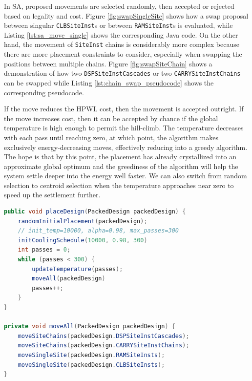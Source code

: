 In SA, proposed movements are selected randomly, then accepted or rejected based on legality and cost. 
Figure \ref{fig:swapSingleSite} shows how a swap proposal between singular \texttt{CLBSiteInst}s or between \texttt{RAMSiteInst}s is evaluated, while Listing \ref{lst:sa_move_single} shows the corresponding Java code.
On the other hand, the movement of \texttt{SiteInst} chains is considerably more complex because there are more placement constraints to consider, especially when swapping the positions between multiple chains.
Figure \ref{fig:swapSiteChain} shows a demonstration of how two \texttt{DSPSiteInstCascades} or two \texttt{CARRYSiteInstChains} can be swapped while Listing \ref{lst:chain_swap_pseudocode} shows the corresponding pseudocode. 

If the move reduces the HPWL cost, then the movement is accepted outright.
If the move increases cost, then it can be accepted by chance if the global temperature is high enough to permit the hill-climb.
The temperature decreases with each pass until reaching zero, at which point, the algorithm makes exclusively energy-decreasing moves, effectively reducing into a greedy algorithm. 
The hope is that by this point, the placement has already crystallized into an approximate global optimum and the greediness of the algorithm will help the system settle deeper into the energy well faster. 
We can also switch from random selection to centroid selection when the temperature approaches near zero to speed up the settlement further. 


\begin{lstlisting}[language=java, caption={SA pseudocode: outer loop}, label={lst:sa_outer}]
public void placeDesign(PackedDesign packedDesign) {
    randomInitialPlacement(packedDesign);
    // init_temp=10000, alpha=0.98, max_passes=300
    initCoolingSchedule(10000, 0.98, 300)
    int passes = 0;
    while (passes < 300) {
        updateTemperature(passes);
        moveAll(packedDesign)
        passes++;
    }
}

private void moveAll(PackedDesign packedDesign) {
    moveSiteChains(packedDesign.DSPSiteInstCascades);
    moveSiteChains(packedDesign.CARRYSiteInstChains);
    moveSingleSite(packedDesign.RAMSiteInsts);
    moveSingleSite(packedDesign.CLBSiteInsts);
}
\end{lstlisting}


